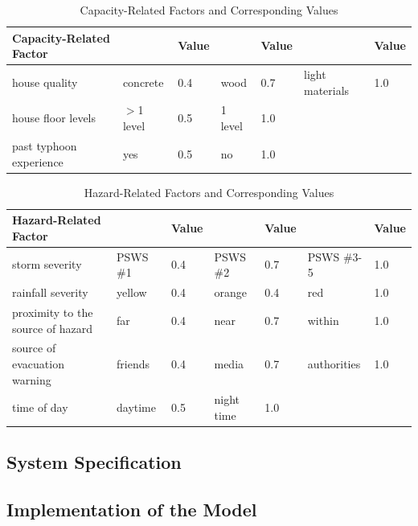 \documentclass[runningheads]{llncs}
\begin{document}
\begin{table}[htb]
\begin{center}
\caption{Capacity-Related Factors and Corresponding Values}
{\small
\hfill{}
\begin{tabular}{|p{4cm}|p{1.5cm}|p{1cm}|p{1.5cm}|p{1cm}|p{2cm}|p{1cm}|}
\hline
Capacity-Related Factor & & Value & & Value & & Value \\
\hline
house quality & concrete & 0.4 & wood & 0.7 & light materials & 1.0 \\
house floor levels & $>$1 level & 0.5 & 1 level & 1.0 &  &  \\
past typhoon experience & yes & 0.5 & no & 1.0 & & \\
\hline
\end{tabular}}
\hfill{}
\label{keynodes_a}
\end{center}
\end{table}

\begin{table}[htb]
\begin{center}
\caption{Hazard-Related Factors and Corresponding Values}
{\small
\hfill{}
\begin{tabular}{|p{4.5cm}|p{1.5cm}|p{1cm}|p{1.5cm}|p{1cm}|p{2cm}|p{1cm}|}
\hline
Hazard-Related Factor & & Value & & Value & & Value \\
\hline
storm severity & PSWS \#1 & 0.4 & PSWS \#2 & 0.7 & PSWS \#3-5 & 1.0 \\
rainfall severity & yellow & 0.4 & orange & 0.4 & red & 1.0 \\
proximity to the source of hazard & far & 0.4 & near & 0.7 & within & 1.0 \\
source of evacuation warning & friends & 0.4 & media & 0.7 & authorities & 1.0 \\
time of day & daytime & 0.5 & night time & 1.0 & & \\
\hline
\end{tabular}}
\hfill{}
\label{keynodes_a}
\end{center}
\end{table}

\subsection{System Specification}

\subsection{Implementation of the Model}
\end{document}
